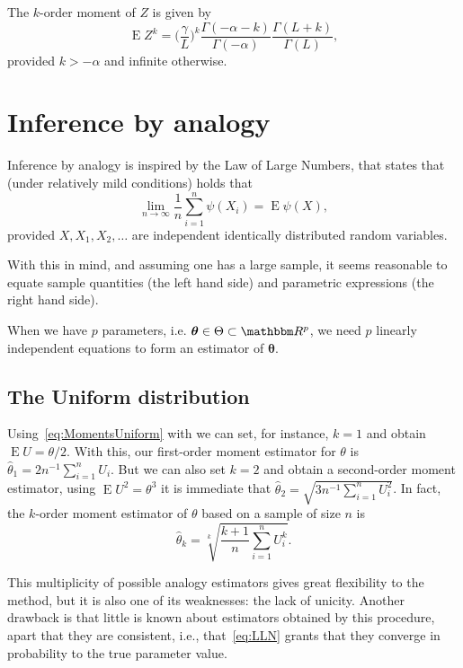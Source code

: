 The $k$-order moment of $Z$ is given by
\begin{equation}
\operatorname{E}Z^k = \Big(\frac{\gamma}{L}\Big)^k
\frac{\Gamma(-\alpha-k)}{\Gamma(-\alpha)}
\frac{\Gamma(L+k)}{\Gamma(L)},
\label{eq:MomGI0}
\end{equation}
provided $k>-\alpha$ and infinite otherwise.

\section{Inference by analogy}

Inference by analogy\cite{manski_analog} is inspired by the Law of Large Numbers, that states that (under relatively mild conditions) holds that
\begin{equation}
\lim_{n\to\infty}\frac1n\sum_{i=1}^{n} \psi(X_i) = 
\operatorname{E}\psi(X),
\label{eq:LLN}
\end{equation}
provided $X,X_1,X_2,\dots$ are independent identically distributed random variables.

With this in mind, and assuming one has a large sample, it seems reasonable to equate sample quantities (the left hand side) and parametric expressions (the right hand side).

When we have $p$ parameters, i.e. $\bm \theta\in\Theta\subset\mathbbm R^p$, we need $p$ linearly independent equations to form an estimator of $\bm \theta$.

\subsection{The Uniform distribution}

Using~\eqref{eq:MomentsUniform} with we can set, for instance, $k=1$ and obtain $\operatorname{E}U=\theta/2$.
With this, our first-order moment estimator for $\theta$ is $\widehat{\theta}_1=2n^{-1}\sum_{i=1}^n U_i$.
But we can also set $k=2$ and obtain a second-order moment estimator, using $\operatorname{E}U^2=\theta^3$ it is immediate that
$\widehat{\theta}_2=\sqrt{3n^{-1}\sum_{i=1}^{n} U_i^2}$.
In fact, the $k$-order moment estimator of $\theta$ based on a sample of size $n$ is
\begin{equation}
\widehat{\theta}_k = \sqrt[k]{\frac{k+1}{n} \sum_{i=1}^{n} U_i^k}.
\end{equation}

This multiplicity of possible analogy estimators gives great flexibility to the method, but it is also one of its weaknesses: the lack of unicity.
Another drawback is that little is known about estimators obtained by this procedure, apart that they are consistent, i.e., that~\eqref{eq:LLN} grants that they converge in probability to the true parameter value.

